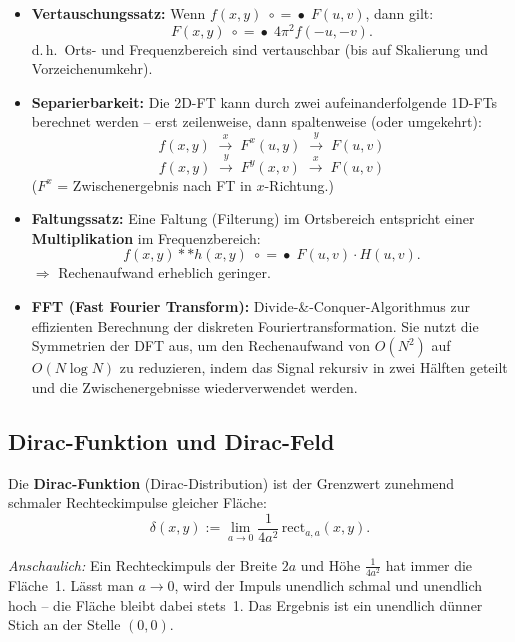\documentclass[12pt, a4paper]{article}
\begin{document}
\begin{itemize}
  \item \textbf{Vertauschungssatz:} Wenn $f(x,y) \;\circ\!=\!\bullet\; F(u,v)$,
        dann gilt:
        \[ F(x,y) \;\circ\!=\!\bullet\; 4\pi^2 f(-u,-v). \]
        d.\,h.\ Orts- und Frequenzbereich sind vertauschbar (bis auf Skalierung
        und Vorzeichenumkehr).

  \item \textbf{Separierbarkeit:} Die 2D-FT kann durch zwei aufeinanderfolgende
        1D-FTs berechnet werden -- erst zeilenweise, dann spaltenweise
        (oder umgekehrt):
        \[
          f(x,y)
          \;\xrightarrow{\;x\;}\;
          F^x(u,y)
          \;\xrightarrow{\;y\;}\;
          F(u,v)
        \]
        \[
          f(x,y)
          \;\xrightarrow{\;y\;}\;
          F^y(x,v)
          \;\xrightarrow{\;x\;}\;
          F(u,v)
        \]
        ($F^x$ = Zwischenergebnis nach FT in $x$-Richtung.)

  \item \textbf{Faltungssatz:} Eine Faltung (Filterung) im Ortsbereich
        entspricht einer \textbf{Multiplikation} im Frequenzbereich:
        \[ f(x,y) \ast\ast h(x,y) \;\circ\!=\!\bullet\; F(u,v)\cdot H(u,v). \]
        $\Rightarrow$ Rechenaufwand erheblich geringer.

  \item \textbf{FFT (Fast Fourier Transform):} Divide-\&-Conquer-Algorithmus
        zur effizienten Berechnung der diskreten Fouriertransformation.
        Sie nutzt die Symmetrien der DFT aus, um den Rechenaufwand von
        $O(N^2)$ auf $O(N\log N)$ zu reduzieren, indem das Signal
        rekursiv in zwei Hälften geteilt und die Zwischenergebnisse
        wiederverwendet werden.
\end{itemize}

\subsection{Dirac-Funktion und Dirac-Feld}

\begin{definitionbox}
Die \textbf{Dirac-Funktion} (Dirac-Distribution) ist der Grenzwert
zunehmend schmaler Rechteckimpulse gleicher Fläche:
\[
  \delta(x,y) := \lim_{a\to 0} \frac{1}{4a^2}\,\mathrm{rect}_{a,a}(x,y).
\]
\end{definitionbox}

\textit{Anschaulich:} Ein Rechteckimpuls der Breite $2a$ und Höhe $\frac{1}{4a^2}$ hat immer die Fläche~1. Lässt man $a\to 0$, wird der Impuls unendlich schmal und unendlich hoch -- die Fläche bleibt dabei stets~1. Das Ergebnis ist ein \glqq{}unendlich dünner Stich\grqq{} an der Stelle $(0,0)$.
\end{document}
